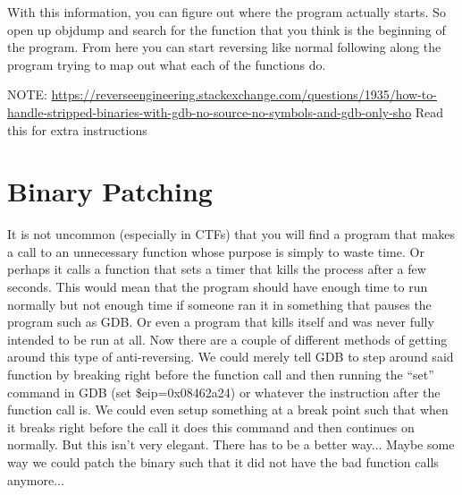 \documentclass{report}
\begin{document}
With this information, you can figure out where the program actually starts.  So
open up objdump and search for the function that you think is the beginning of the program.
From here you can start reversing like normal following along the program trying to 
map out what each of the functions do.

NOTE: \url{https://reverseengineering.stackexchange.com/questions/1935/how-to-handle-stripped-binaries-with-gdb-no-source-no-symbols-and-gdb-only-sho}  Read this for extra instructions

\section{Binary Patching}
It is not uncommon (especially in CTFs) that you will find a program that makes a call to an unnecessary function whose purpose is simply to waste time.  Or perhaps it calls a function that sets a timer that kills the process after a few seconds.  This would mean that the program should have enough time to run normally but not enough time if someone ran it in something that pauses the program such as GDB.  Or even a program that kills itself and was never fully intended to be run at all.  Now there are a couple of different methods of getting around this type of anti-reversing.  We could merely tell GDB to step around said function by breaking right before the function call and then running the ``set'' command in GDB (set \$eip=0x08462a24) or whatever the instruction after the function call is.  We could even setup something at a break point such that when it breaks right before the call it does this command and then continues on normally.  But this isn't very elegant.  There has to be a better way...
Maybe some way we could patch the binary such that it did not have the bad function calls anymore...
\end{document}
